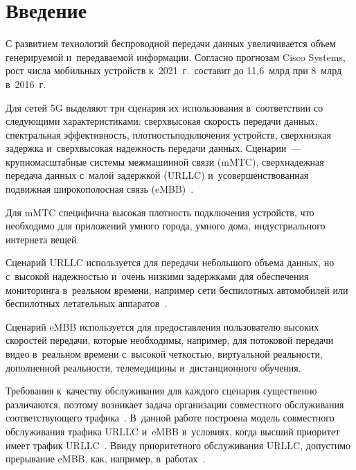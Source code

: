\begin{multicols}{2}

\label{st\stat}


\section{Введение}

С развитием технологий беспроводной передачи данных увеличивается объем генерируемой и~передаваемой
 информации. Согласно прогнозам Cisco Systems, рост числа мобильных устройств к~2021~г.\ составит 
 до 11,6~млрд при 8~млрд в~2016~г. 
 
 Для сетей 5G выделяют три сценария их 
 использования в~соответствии со следующими характеристиками: сверхвысокая скорость передачи данных, 
 спектральная эффективность, плотность\linebreak подключения устройств, сверхнизкая задержка и~сверхвысокая 
 надежность передачи данных. Сценарии~--- крупномасштабные системы межмашинной связи (mMTC), 
 сверхнадежная передача данных с~малой задержкой (URLLC) 
 и~усовершенствованная подвижная широкополосная связь 
 (\mbox{eMBB})~\cite{Popovski2018}.
 
  Для mMTC специфична высокая плотность подключения устройств, что необходимо 
  для приложений умного города, умного дома, индустриального интернета вещей. 
  
  Сценарий URLLC используется для 
  передачи небольшого объема данных, но с~высокой надежностью и~очень низкими задержками для обеспечения 
  мониторинга в~реальном времени, например сети беспилотных автомобилей или беспилотных летательных 
  аппаратов~\cite{Cheng2020, Tun2020}. 
  
  Сценарий \mbox{eMBB} используется для предоставления пользователю высоких скоростей
   передачи, которые необходимы, например, для потоковой передачи видео в~реальном времени с~высокой 
   чет\-костью, виртуальной реальности,  дополненной реальности, телемедицины и~дистанционного обучения.


Требования к~качеству обслуживания для каж\-до\-го сценария существенно различаются, поэтому возникает 
задача организации совместного обслуживания соответствующего трафика~\cite{DosSantos2020, Kim2020}. 
В~данной работе построена модель совместного обслуживания трафика URLLC и~\mbox{eMBB} в~условиях, когда 
высший приоритет имеет трафик URLLC~\cite{Anand2020, Li2020}. Ввиду приоритетного обслуживания URLLC, 
допустимо прерывание \mbox{eMBB}, как, например, в~работах~\cite{Gudkova2012, Makeeva2019}. 


\end{multicols}
